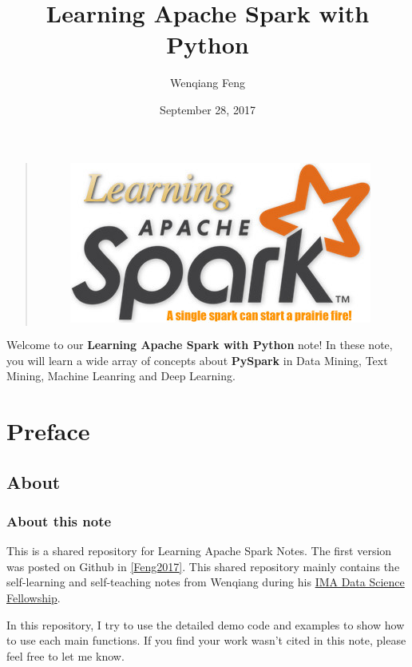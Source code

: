 \documentclass[letterpaper,11pt,english]{sphinxmanual}
\title{Learning Apache Spark with Python}
\date{September 28, 2017}
\author{Wenqiang Feng}
\begin{document}
\maketitle
\tableofcontents
{}\label{index::doc}\label{index:index}\begin{quote}
\begin{figure}[htbp]
\centering

\includegraphics{logo.jpg}
\label{index:fig-logo}\end{figure}
\end{quote}

Welcome to our \textbf{Learning Apache Spark with Python} note!
In these note, you will learn a wide array of concepts about
\textbf{PySpark} in Data Mining, Text Mining, Machine Leanring
and Deep Learning.




\chapter{Preface}
\label{preface:id1}\label{preface::doc}\label{preface:contents}\label{preface:preface}

\section{About}
\label{preface:about}

\subsection{About this note}
\label{preface:about-this-note}
This is a shared repository for Learning Apache Spark Notes.
The first version was posted on Github in {\hyperref[reference:feng2017]{{[}Feng2017{]}}}.
This shared repository mainly contains the self-learning and
self-teaching notes from Wenqiang during his \href{https://www.ima.umn.edu/2016-2017/SW1.23-3.10.17\#}{IMA Data Science
Fellowship}.

In this repository, I try to use the detailed demo code and
examples to show how to use each main functions. If you find
your work wasn’t cited in this note, please feel free to let
me know.
\end{document}
